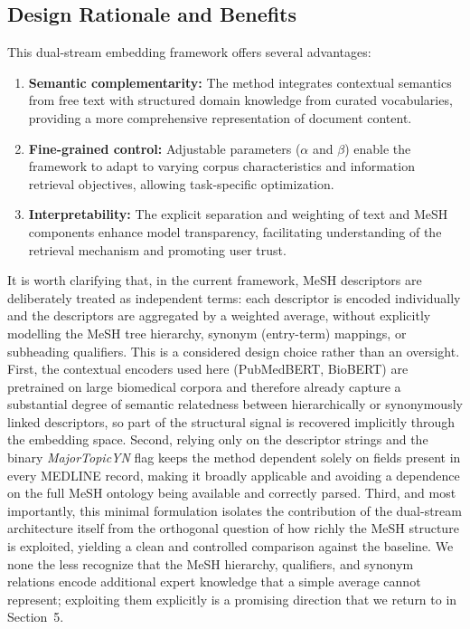 \documentclass[authorproof,JACIII,researchpaper]{fujipressarticle}
\begin{document}
\subsection{Design Rationale and Benefits}
This dual-stream embedding framework offers several advantages:
\begin{enumerate}[leftmargin=*,label=\arabic*)]
    \item \textbf{Semantic complementarity:} The method integrates contextual semantics from free text with structured domain knowledge from curated vocabularies, providing a more comprehensive representation of document content.

    \item \textbf{Fine-grained control:} Adjustable parameters ($\alpha$ and $\beta$) enable the framework to adapt to varying corpus characteristics and information retrieval objectives, allowing task-specific optimization.

    \item \textbf{Interpretability:} The explicit separation and weighting of text and MeSH components enhance model transparency, facilitating understanding of the retrieval mechanism and promoting user trust.
\end{enumerate}

{\color{red}%
It is worth clarifying that, in the current framework, MeSH descriptors are deliberately treated as independent terms: each descriptor is encoded individually and the descriptors are aggregated by a weighted average, without explicitly modelling the MeSH tree hierarchy, synonym (entry-term) mappings, or subheading qualifiers. This is a considered design choice rather than an oversight. First, the contextual encoders used here (PubMedBERT, BioBERT) are pretrained on large biomedical corpora and therefore already capture a substantial degree of semantic relatedness between hierarchically or synonymously linked descriptors, so part of the structural signal is recovered implicitly through the embedding space. Second, relying only on the descriptor strings and the binary \textit{MajorTopicYN} flag keeps the method dependent solely on fields present in every MEDLINE record, making it broadly applicable and avoiding a dependence on the full MeSH ontology being available and correctly parsed. Third, and most importantly, this minimal formulation isolates the contribution of the dual-stream architecture itself from the orthogonal question of how richly the MeSH structure is exploited, yielding a clean and controlled comparison against the baseline. We none the less recognize that the MeSH hierarchy, qualifiers, and synonym relations encode additional expert knowledge that a simple average cannot represent; exploiting them explicitly is a promising direction that we return to in Section~5.
}%
\end{document}
